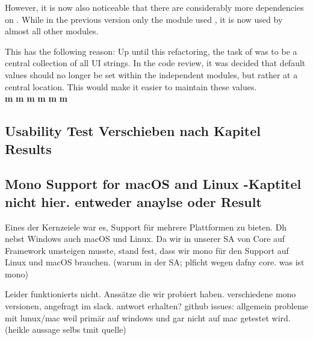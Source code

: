 However, it is now also noticeable that there are considerably more dependencies on .
While in the previous version only the module  used , it is now used by almost all other modules.

This has the following reason: Up until this refactoring, the task of  was to be a central collection of all UI strings. 
In the code review, it was decided that default values should no longer be set within the independent modules,
but rather at a central location.
This would make it easier to maintain these values. \\



\textbf{m}
\textbf{m}
\textbf{m}
\textbf{m}
\textbf{m}
\textbf{m}



\subsection{Usability Test Verschieben nach Kapitel Results}


\subsection{Mono Support for macOS and Linux -Kaptitel nicht hier. entweder anaylse oder Result}
Eines der Kernzeiele war es, Support für mehrere Plattformen zu bieten. Dh nebst Windows auch macOS und Linux.
Da wir in unserer SA von Core auf Framework umsteigen musste, stand fest, dass wir mono für den Support auf Linux und macOS brauchen.
(warum in der SA; plficht wegen dafny core. was ist mono)

Leider funktionierts nicht.
Anssätze die wir probiert haben. verschiedene mono versionen, angefragt im slack. antwort erhalten?
github issues: allgemein probleme mit lunux/mac weil primär auf windows und gar nicht auf mac getestet wird. (heikle aussage selbs tmit quelle)

\cite{sa}
\cite{mono-slack}
\cite{mono-git}
